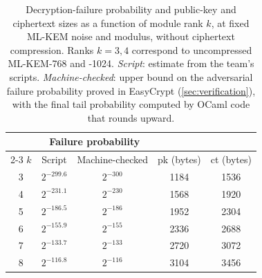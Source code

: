 \begin{table}[h]
\centering
\caption{Decryption-failure probability and public-key and ciphertext
sizes as a function of module rank $k$, at fixed ML-KEM noise and modulus,
without ciphertext compression. Ranks $k=3,4$ correspond to
uncompressed ML-KEM-768 and -1024. \emph{Script}: estimate from the \kyber team's
scripts. \emph{Machine-checked}: upper bound on the adversarial failure probability proved in
EasyCrypt (\cref{sec:verification}), with the final tail probability computed by OCaml
code that rounds upward.}
\label{tab:cbd-baseline}
\begin{tabular}{ccccc}
\toprule
 & \multicolumn{2}{c}{Failure probability} & & \\
\cmidrule(lr){2-3}
$k$ & Script & Machine-checked & pk (bytes) & ct (bytes) \\
\midrule
3 & $2^{-299.6}$ & $2^{-300}$ & 1184  & 1536 \\
4 & $2^{-231.1}$ & $2^{-230}$ & 1568  & 1920 \\
5 & $2^{-186.5}$ & $2^{-186}$ & 1952  & 2304 \\
6 & $2^{-155.9}$ & $2^{-155}$ & 2336  & 2688 \\
7 & $2^{-133.7}$ & $2^{-133}$ & 2720  & 3072 \\
\rowcolor{failbg}
8 & $2^{-116.8}$ & $2^{-116}$ & 3104  & 3456 \\
\bottomrule
\end{tabular}
\end{table}
